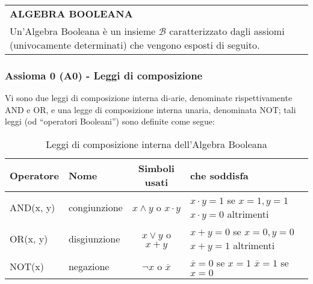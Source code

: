 \documentclass[a4paper]{extarticle}
\newcommand{\quotes}[1]{``#1''}
\renewcommand\arraystretch{}
\begin{document}
\vspace{1em}
\setlength{\tabcolsep}{14pt}
\renewcommand{\arraystretch}{2}
\noindent
\begin{tabularx}{\textwidth}{@{}|P|@{}}
    \hline
    {\textbf{ALGEBRA BOOLEANA}}\\
    \parbox{\linewidth}{Un'Algebra Booleana è un insieme \(\mathcal{B}\) caratterizzato dagli assiomi (univocamente determinati) che vengono esposti di seguito.
    \vspace{3mm}}\\
    \hline
\end{tabularx}

\subsubsection{Assioma 0 (A0) - Leggi di composizione}
Vi sono due leggi di composizione interna di-arie, denominate rispettivamente AND e OR, e una legge di composizione interna unaria, denominata NOT; tali leggi (od \quotes{operatori Booleani}) sono definite come segue:

\begin{table}[H]
    \centering
    \begin{tabularx}{\textwidth}{l|l|c|P}
         \textbf{Operatore} & \textbf{Nome} & \textbf{Simboli usati} & \textbf{che soddisfa}\\
         \hline
         AND(x, y) & congiunzione & \(x \wedge y\) \hspace{0.5em} o \hspace{0.5em} \(x \cdot y\) & \parbox{\linewidth}{\(x \cdot y = 1\) se \(x = 1, y = 1\)\\ \(x \cdot y = 0\) altrimenti}\\
         OR(x, y) & disgiunzione & \hspace{0.2em} \(x \vee y\) \hspace{0.5 em} o \hspace{0.5em} \(x + y\) & \parbox{\linewidth}{\(x + y = 0\) se \(x = 0, y = 0\)\\ \(x + y = 1\) altrimenti}\\
         NOT(x) & negazione & \(\neg x\) \hspace{1em} o \hspace{1em} \(\overline{x}\) & \parbox{\linewidth}{\(\overline{x} = 0\) se \(x = 1\) \\ \(\overline{x} = 1\) se \(x = 0\)}\\
    \end{tabularx}
    \caption{Leggi di composizione interna dell'Algebra Booleana}
    \label{tab:leggi_composizione_interna}
\end{table}
\end{document}
